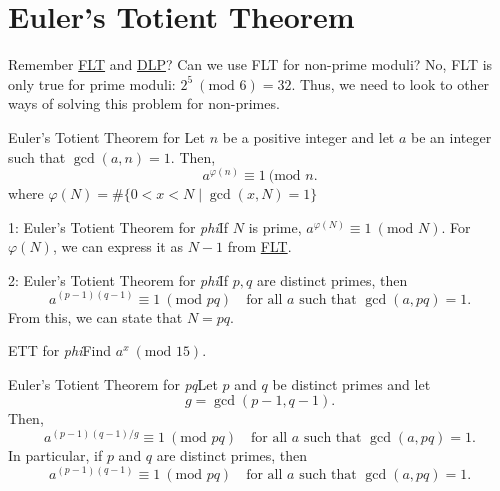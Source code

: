 \section{Euler's Totient Theorem}

Remember \hyperlink{thm:Fermat's Little Theorem}{FLT} and \hyperlink{Discrete Logarithm Problem}{DLP}? Can we use FLT for non-prime moduli? No, FLT is only true for prime moduli: \(2^5 \ (\text{mod 6}) = 32 \). Thus, we need to look to other ways of solving this problem for non-primes.

\begin{theorem}
    {Euler's Totient Theorem for }Let \(n\) be a positive integer and let \(a\) be an integer such that \(\gcd(a, n) = 1\). Then, \[
    a^{\varphi(n)} \equiv 1 \ (\text{mod }{n}.
    \] where \(\varphi(N) = \#\{0 < x < N \mid \gcd(x,N) = 1\}\) 
\end{theorem}

\begin{corollary}
    {1: Euler's Totient Theorem for \textit{phi}}If \(N\) is prime, \(a^{\varphi(N)} \equiv 1 \ (\text{mod } N)\). For \(\varphi(N)\), we can express it as \(N-1\) from \hyperlink{thm:Fermat's Little Theorem}{FLT}.
\end{corollary}


\begin{corollary}
    {2: Euler's Totient Theorem for \textit{phi}}If \(p,q\) are distinct primes, then \[
    a^{(p-1)(q-1)} \equiv 1 \ (\text{mod } pq) \quad \text{for all } a  \text{ such that } \gcd(a, pq) = 1.
    \] From this, we can state that \(N = pq\).
\end{corollary}


\begin{example}
    {ETT for \textit{phi}}Find \(a^x \ (\text{mod } 15)\). 
\end{example}



\begin{theorem}
    {Euler's Totient Theorem for \textit{pq}}Let \(p\) and \(q\) be distinct primes and let \[
    g = \gcd(p-1, q-1).
    \]Then, \[
    a^{(p-1)(q-1)/g} \equiv 1 \ (\text{mod } pq) \quad \text{for all } a  \text{ such that } \gcd(a, pq) = 1.
    \] In particular, if \(p\) and \(q\) are distinct primes, then \[
    a^{(p-1)(q-1)} \equiv 1 \ (\text{mod } pq) \quad \text{for all } a  \text{ such that } \gcd(a, pq) = 1.
    \]
\end{theorem}

